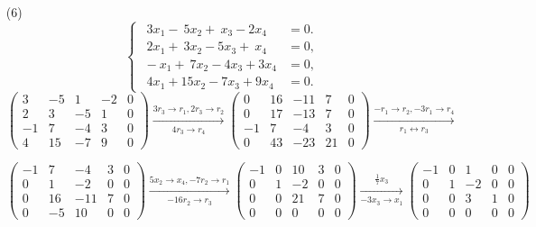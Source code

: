 \documentclass{article}
\begin{document}
\begin{enumerate}
\begin{enumerate}
            \item [(6)]
            \[
                \begin{cases}
                    \ \ 3x_1-\ 5x_2+\ x_3-2x_4&=0.\\
                    \ \ 2x_1+\ 3x_2-5x_3+\ x_4&=0,\\
                    \ -x_1+\ 7x_2-4x_3+3x_4&=0,\\
                    \ \ 4x_1+15x_2-7x_3+9x_4&=0.
                \end{cases}
            \]
            $
            \begin{pmatrix}
                3& -5& 1& -2& 0\\
                2& 3& -5& 1& 0\\
                -1& 7& -4& 3& 0\\
                4& 15& -7& 9& 0
            \end{pmatrix}
            \xrightarrow[4r_3 \rightarrow r_4]{3r_3 \rightarrow r_1,2r_3 \rightarrow r_2}
            \begin{pmatrix}
                0& 16& -11& 7& 0\\
                0& 17& -13& 7& 0\\
                -1& 7& -4& 3& 0\\
                0& 43& -23& 21& 0
            \end{pmatrix}
            \xrightarrow[r_1 \leftrightarrow r_3]{-r_1 \rightarrow r_2,-3r_1 \rightarrow r_4}
            $

            $
                \begin{pmatrix}
                    -1& 7& -4& 3& 0\\
                    0& 1& -2& 0& 0\\
                    0& 16& -11& 7& 0\\
                    0& -5& 10& 0& 0
                \end{pmatrix}
                \xrightarrow[-16r_2 \rightarrow r_3]{5x_2 \rightarrow x_4,-7r_2 \rightarrow r_1}
                \begin{pmatrix}
                    -1& 0& 10& 3& 0\\
                    0& 1& -2& 0& 0\\
                    0& 0& 21& 7& 0\\
                    0& 0& 0& 0& 0    
                \end{pmatrix}
                \xrightarrow[-3x_3 \rightarrow x_1]{\frac{1}{7}x_3}
                \begin{pmatrix}
                    -1& 0& 1& 0& 0\\
                    0& 1& -2& 0& 0\\
                    0& 0& 3& 1& 0\\
                    0& 0& 0& 0& 0 
                \end{pmatrix}
            $


\end{enumerate}
\end{enumerate}
\end{document}
